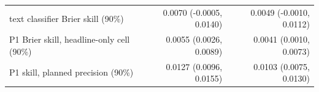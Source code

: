 \begin{tabular}{lrr}
text classifier Brier skill (90\%) & 0.0070 (-0.0005, 0.0140) & 0.0049 (-0.0010, 0.0112) \\
P1 Brier skill, headline-only cell (90\%) & 0.0055 (0.0026, 0.0089) & 0.0041 (0.0010, 0.0073) \\
\midrule
P1 skill, planned precision (90\%) & 0.0127 (0.0096, 0.0155) & 0.0103 (0.0075, 0.0130) \\

\end{tabular}
